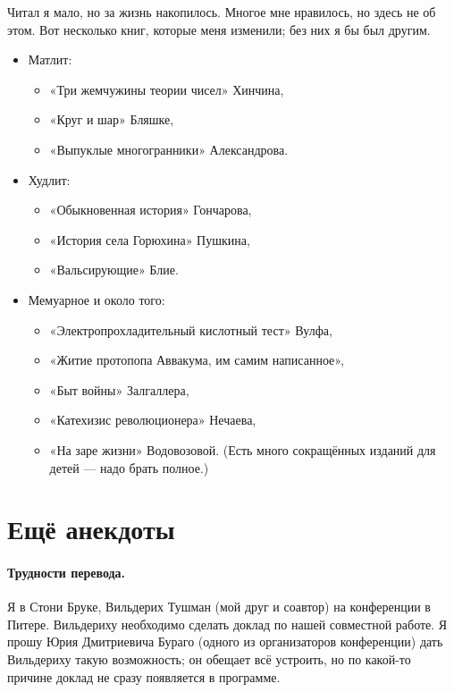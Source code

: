\documentclass{book}
\begin{document}
Читал я мало, но за жизнь накопилось.
Многое мне нравилось, но здесь не об этом.
Вот несколько книг, которые меня изменили; без них я бы был другим.
\begin{itemize}
\item Матлит:
\begin{itemize}
\item «Три жемчужины теории чисел» Хинчина,
\item «Круг и шар» Бляшке,
\item «Выпуклые многогранники» Александрова.
\end{itemize}

\item Худлит:
\begin{itemize}
\item «Обыкновенная история» Гончарова,
\item «История села Горюхина» Пушкина,
\item «Вальсирующие» Блие.
\end{itemize}

\item Мемуарное и около того:
\begin{itemize}
\item «Электропрохладительный кислотный тест» Вулфа,
\item «Житие протопопа Аввакума, им самим написанное»,
\item «Быт войны» Залгаллера,
\item «Катехизис революционера» Нечаева,
\item «На заре жизни» Водовозовой. (Есть много сокращённых изданий для детей --- надо брать полное.)
\end{itemize} 

\end{itemize}

\section*{Ещё анекдоты}

\paragraph{Трудности перевода.}
Я в Стони Бруке, Вильдерих Тушман (мой друг и соавтор) на конференции в Питере.
Вильдериху необходимо сделать доклад по нашей совместной работе.
Я прошу Юрия Дмитриевича Бураго (одного из организаторов конференции) дать Вильдериху такую возможность;
он обещает всё устроить, но по какой-то причине доклад не сразу появляется в программе.
\end{document}

